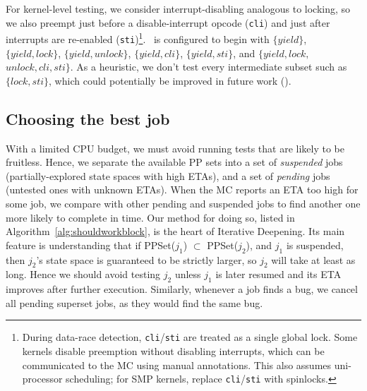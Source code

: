 For kernel-level testing, we consider interrupt-disabling analogous to locking,
so we also preempt just before a disable-interrupt opcode ({\tt cli}) and just after interrupts are re-enabled ({\tt sti})\footnote{
During data-race detection, {\tt cli}/{\tt sti} are treated as a single global lock.
Some kernels disable preemption without disabling interrupts,
which can be communicated to the MC using manual annotations. %
This also assumes uni-processor scheduling; for SMP kernels, replace {\tt cli}/{\tt sti} with spinlocks.}.
\quicksand~is configured to begin with
$\{yield\}$,
$\{yield,lock\}$,
$\{yield,unlock\}$,
$\{yield,cli\}$,
$\{yield,sti\}$,
and $\{yield,lock,$ $unlock,cli,sti\}$.
As a heuristic, we don't test every intermediate subset such as $\{lock,sti\}$,
which could potentially be improved in future work (\sect{\ref{sec:future}}).


\subsection{Choosing the best job}

\newcommand\PendingJobs{\ensuremath{\mathcal{P}}}
\newcommand\SuspendedJobs{\ensuremath{\mathcal{S}}}
\newcommand\GetETA[1]{ETA(#1)}
\newcommand\GetPPSet[1]{PPSet(#1)}
With a limited CPU budget, we must avoid running tests that are likely to be fruitless.
Hence, we separate the available PP sets into a set of {\em suspended} jobs (partially-explored state spaces with high ETAs),
and a set of {\em pending} jobs (untested ones with unknown ETAs).
When the MC reports an ETA too high for some job,
we compare with other pending and suspended jobs to find another one more likely to complete in time.
%
Our method for doing so, listed in Algorithm~\ref{alg:shouldworkblock}, is the heart of Iterative Deepening.
Its main feature is understanding that if \GetPPSet{$j_1$} $\subset$ \GetPPSet{$j_2$},
and $j_1$ is suspended,
then $j_2$'s state space is guaranteed to be strictly larger, so $j_2$ will take at least as long.
Hence we should avoid testing $j_2$ unless $j_1$ is later resumed and its ETA improves after further execution. %
Similarly, whenever a job finds a bug, we cancel all pending superset jobs, as they would find the same bug.


